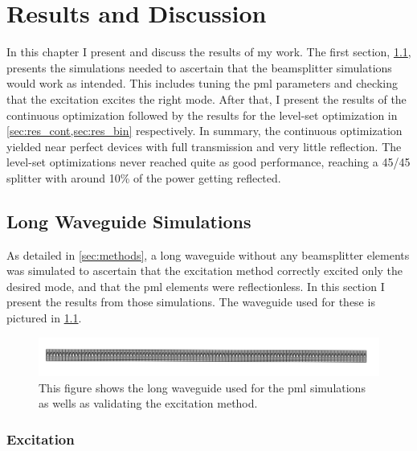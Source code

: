 \chapter{Results and Discussion}

In this chapter I present and discuss the results of my work.
The first section, \cref{sec:long_waveguide}, presents the simulations needed to
ascertain that the beamsplitter simulations would work as intended.
This includes tuning the \gls{pml} parameters and checking that the excitation
excites the right mode.
After that, I present the results of the continuous optimization followed by the
results for the level-set optimization in \cref{sec:res_cont,sec:res_bin}
respectively.
In summary, the continuous optimization yielded near perfect devices with full
transmission and very little reflection.
The level-set optimizations never reached quite as good performance, reaching a
45/45 splitter with around 10\% of the power getting reflected.

\section{Long Waveguide Simulations}\label{sec:long_waveguide}

As detailed in \cref{sec:methods}, a long waveguide without any beamsplitter
elements was simulated to ascertain that the excitation method correctly excited
only the desired mode, and that the \gls{pml} elements were reflectionless.
In this section I present the results from those simulations.
The waveguide used for these is pictured in \cref{fig:long_waveguide}.

\begin{figure}[htpb]
	\centering
	\includegraphics[width=\textwidth]{chapters/results/long_waveguide_geom.png}
	\caption{%
		This figure shows the long waveguide used for the \gls{pml} simulations
		as wells as validating the excitation method.
	}%
	\label{fig:long_waveguide}
\end{figure}

\subsection{Excitation}

